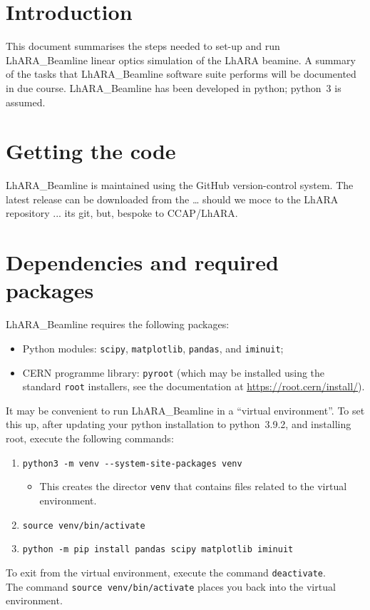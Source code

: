\section*{Introduction}
This document summarises the steps needed to set-up and run
LhARA\_Beamline linear optics simulation of the LhARA beamine.
A summary of the tasks that LhARA\_Beamline software suite performs
will be documented in due course.
LhARA\_Beamline has been developed in python; python~3 is assumed.

\section*{Getting the code}
LhARA\_Beamline is maintained using the GitHub version-control system.
The latest release can be downloaded from the {\color{red} \ldots
should we moce to the LhARA repository ... its git, but, bespoke to
CCAP/LhARA}.

\section*{Dependencies and required packages}
LhARA\_Beamline requires the following packages:
\begin{itemize}
  \item Python modules: \verb+scipy+, \verb+matplotlib+,
    \verb+pandas+, and \verb+iminuit+; 
  \item CERN programme library: \verb+pyroot+ (which may be installed
    using the standard \verb+root+ installers, see the documentation
    at \href{https://root.cern/install/}{\underline{\color{blue}https://root.cern/install/}}).
\end{itemize}
It may be convenient to run LhARA\_Beamline in a ``virtual environment''.
To set this up, after updating your python installation to python~3.9.2,
and installing root, execute the following commands:
\begin{enumerate}
  \item \verb+python3 -m venv --system-site-packages venv+
    \begin{itemize}
      \item This creates the director \verb+venv+ that contains files
        related to the virtual environment.
    \end{itemize}
  \item \verb+source venv/bin/activate+
  \item \verb+python -m pip install pandas scipy matplotlib iminuit+
\end{enumerate}
To exit from the virtual environment, execute the command
\verb+deactivate+. \\
\noindent
The command \verb+source venv/bin/activate+ places you back
into the virtual environment.

